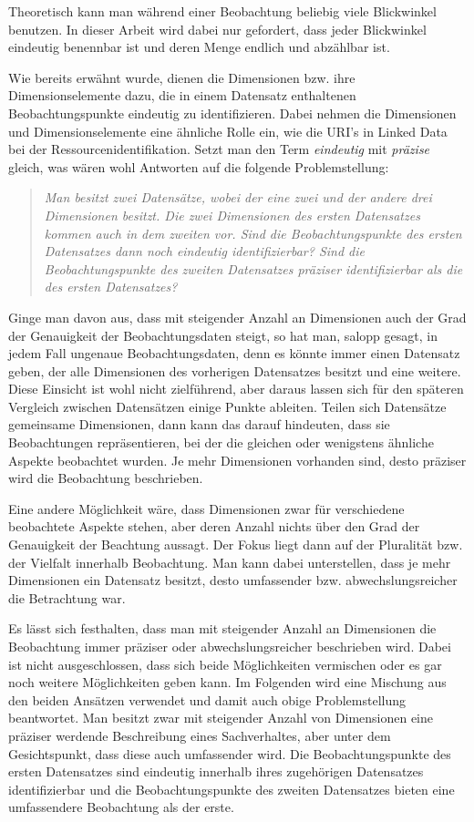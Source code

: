 \documentclass[11pt]{article}
\newcommand{\com}[1]{\marginpar{\em {\small{#1}}}} %
\begin{document}
\noindent
Theoretisch kann man während einer Beobachtung beliebig viele Blickwinkel benutzen. In dieser Arbeit wird dabei nur gefordert, dass jeder Blickwinkel eindeutig benennbar ist und deren Menge endlich und abzählbar ist.

Wie bereits erwähnt wurde, dienen die Dimensionen bzw. ihre Dimensionselemente dazu, die in einem Datensatz enthaltenen Beobachtungspunkte eindeutig zu identifizieren. Dabei nehmen die Dimensionen und Dimensionselemente eine ähnliche Rolle ein, wie die URI's in Linked Data bei der Ressourcenidentifikation. Setzt man den Term \emph{eindeutig} mit \emph{präzise} gleich, was wären wohl Antworten auf die folgende Problemstellung: 

\begin{quote}
    \emph{Man besitzt zwei Datensätze, wobei der eine zwei und der andere drei Dimensionen besitzt. Die zwei Dimensionen des ersten Datensatzes kommen auch in dem zweiten vor. Sind die Beobachtungspunkte des ersten Datensatzes dann noch eindeutig identifizierbar? Sind die Beobachtungspunkte des zweiten Datensatzes präziser identifizierbar als die des ersten Datensatzes?}
\end{quote}

\noindent
Ginge\com{Arten der \\Präzisierung} man davon aus, dass mit steigender Anzahl an Dimensionen auch der Grad der Genauigkeit der Beobachtungsdaten steigt, so hat man, salopp gesagt, in jedem Fall ungenaue Beobachtungsdaten, denn es könnte immer einen Datensatz geben, der alle Dimensionen des vorherigen Datensatzes besitzt und eine weitere. 
Diese Einsicht ist wohl nicht zielführend, aber daraus lassen sich für den späteren Vergleich zwischen Datensätzen einige Punkte ableiten. Teilen sich Datensätze gemeinsame Dimensionen, dann kann das darauf hindeuten, dass sie Beobachtungen repräsentieren, bei der die gleichen oder wenigstens ähnliche Aspekte beobachtet wurden. Je mehr Dimensionen vorhanden sind, desto präziser wird die Beobachtung beschrieben.

Eine andere Möglichkeit wäre, dass Dimensionen zwar für verschiedene beobachtete Aspekte stehen, aber deren Anzahl nichts über den Grad der Genauigkeit der Beachtung aussagt. Der Fokus liegt dann auf der Pluralität bzw. der Vielfalt innerhalb Beobachtung. Man kann dabei unterstellen, dass je mehr Dimensionen ein Datensatz besitzt, desto umfassender bzw. abwechslungsreicher die Betrachtung war.

Es lässt sich festhalten, dass man mit steigender Anzahl an Dimensionen die Beobachtung immer präziser oder abwechslungsreicher beschrieben wird. Dabei ist nicht ausgeschlossen, dass sich beide Möglichkeiten vermischen oder es gar noch weitere Möglichkeiten geben kann. Im Folgenden wird eine Mischung aus den beiden Ansätzen verwendet und damit auch obige Problemstellung beantwortet. Man besitzt zwar mit steigender Anzahl von Dimensionen eine präziser werdende Beschreibung eines Sachverhaltes, aber unter dem Gesichtspunkt, dass diese auch umfassender wird. Die Beobachtungspunkte des ersten Datensatzes sind eindeutig innerhalb ihres zugehörigen Datensatzes identifizierbar und die Beobachtungspunkte des zweiten Datensatzes bieten eine umfassendere Beobachtung als der erste.
\end{document}
